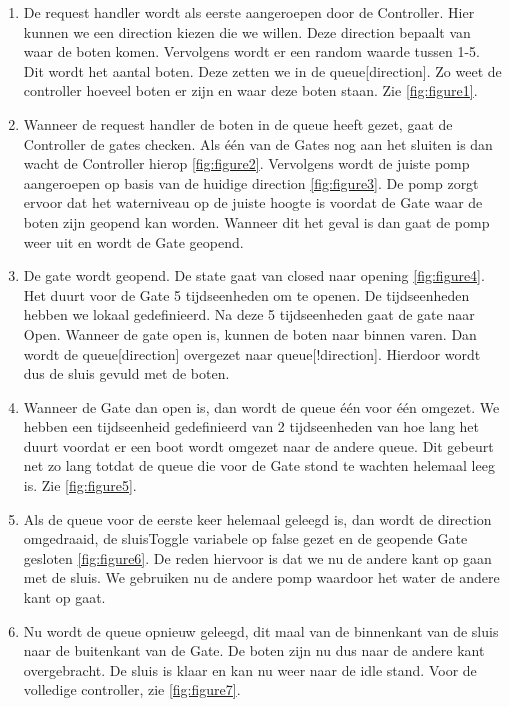 \documentclass[oneside]{scrbook}
\begin{document}
\begin{enumerate}
  \item De request handler wordt als eerste aangeroepen door de Controller. Hier kunnen we een direction kiezen die we willen. Deze direction bepaalt van waar de boten komen. Vervolgens wordt er een random waarde tussen 1-5. Dit wordt het aantal boten. Deze zetten we in de queue[direction]. Zo weet de controller hoeveel boten er zijn en waar deze boten staan. Zie \ref{fig:figure1}.
  
  \item Wanneer de request handler de boten in de queue heeft gezet, gaat de Controller de gates checken. Als één van de Gates nog aan het sluiten is dan wacht de Controller hierop \ref{fig:figure2}. Vervolgens wordt de juiste pomp aangeroepen op basis van de huidige direction \ref{fig:figure3}. De pomp zorgt ervoor dat het waterniveau op de juiste hoogte is voordat de Gate waar de boten zijn geopend kan worden. Wanneer dit het geval is dan gaat de pomp weer uit en wordt de Gate geopend.
  
  \item De gate wordt geopend. De state gaat van closed naar opening \ref{fig:figure4}. Het duurt voor de Gate 5 tijdseenheden om te openen. De tijdseenheden hebben we lokaal gedefinieerd. Na deze 5 tijdseenheden gaat de gate naar Open. Wanneer de gate open is, kunnen de boten naar binnen varen. Dan wordt de queue[direction] overgezet naar queue[!direction]. Hierdoor wordt dus de sluis gevuld met de boten.
    
  \item Wanneer de Gate dan open is, dan wordt de queue één voor één omgezet. We hebben een tijdseenheid gedefinieerd van 2 tijdseenheden van hoe lang het duurt voordat er een boot wordt omgezet naar de andere queue. Dit gebeurt net zo lang totdat de queue die voor de Gate stond te wachten helemaal leeg is. Zie \ref{fig:figure5}.
  
  \item Als de queue voor de eerste keer helemaal geleegd is, dan wordt de direction omgedraaid, de sluisToggle variabele op false gezet en de geopende Gate gesloten \ref{fig:figure6}. De reden hiervoor is dat we nu de andere kant op gaan met de sluis. We gebruiken nu de andere pomp waardoor het water de andere kant op gaat.
  
  \item Nu wordt de queue opnieuw geleegd, dit maal van de binnenkant van de sluis naar de buitenkant van de Gate. De boten zijn nu dus naar de andere kant overgebracht. De sluis is klaar en kan nu weer naar de idle stand. Voor de volledige controller, zie \ref{fig:figure7}.
  
  
\end{enumerate}
\end{document}
